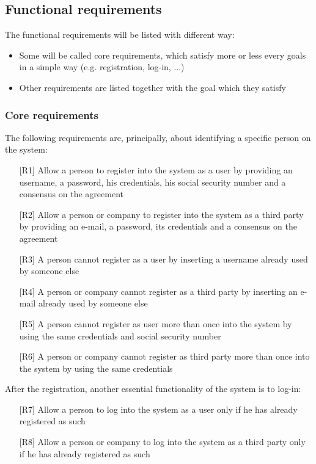 \subsection{Functional requirements}
\par
The functional requirements will be listed with different way:
\begin{itemize}
\item Some will be called core requirements, which satisfy more or less every goals in a simple way (e.g. registration, log-in, ...)
\item Other requirements are listed together with the goal which they satisfy
\end{itemize}

\subsubsection{Core requirements}
\par
The following requirements are, principally, about identifying a specific person on the system:
\begin{itemize}
\item[{[R1]}] Allow a person to register into the system as a user by providing an username, a password, his credentials, his social security number and a consensus on the agreement
\item[{[R2]}] Allow a person or company to register into the system as a third party by providing an e-mail, a password, its credentials and a consensus on the agreement
\item[{[R3]}] A person cannot register as a user by inserting a username already used by someone else
\item[{[R4]}] A person or company cannot register as a third party by inserting an e-mail already used by someone else
\item[{[R5]}] A person cannot register as user more than once into the system by using the same credentials and social security number
\item[{[R6]}] A person or company cannot register as third party more than once into the system by using the same credentials
\end{itemize}
\par
After the registration, another essential functionality of the system is to log-in:
\begin{itemize}
\item[{[R7]}] Allow a person to log into the system as a user only if he has already registered as such
\item[{[R8]}] Allow a person or company to log into the system as a third party only if he has already registered as such
\end{itemize}

